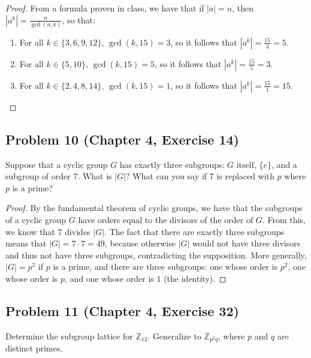 \documentclass{article}
\begin{document}
\begin{proof}

From a formula proven in class, we have that if $|a| = n$, then $|a^k| = \frac{n}{\gcd{(n, k)}}$, so that: 

\begin{enumerate}[label=(\alph*)]
\item For all $k \in \{3, 6, 9, 12\}$, $\gcd{(k, 15)} = 3$, so it follows that $|a^k| = \frac{15}{3} = 5$.
\item For all $k \in \{5, 10\}$, $\gcd{(k, 15)} = 5$, so it follows that $|a^k| = \frac{15}{5} = 3$.
\item For all $k \in \{2, 4, 8, 14\}$, $\gcd{(k, 15)} = 1$, so it follows that $|a^k| = \frac{15}{1} = 15$.

\end{enumerate}

\end{proof}

\subsection*{Problem 10 (Chapter 4, Exercise 14)}
Suppose that a cyclic group $G$ has exactly three subgroups: $G$ itself, $\{e\}$, and a subgroup of order 7. What is $|G|$? What can you say if 7 is replaced with $p$ where $p$ is a prime?

\begin{proof}

By the fundamental theorem of cyclic groups, we have that the subgroups of a cyclic group $G$ have orders equal to the divisors of the order of $G$. From this, we know that 7 divides $|G|$. The fact that there are exactly three subgroups means that $|G| = 7 \cdot 7 = 49$, because otherwise $|G|$ would not have three divisors and thus not have three subgroups, contradicting the supposition. More generally, $|G| = p^2$ if $p$ is a prime, and there are three subgroups: one whose order is $p^2$, one whose order is $p$, and one whose order is 1 (the identity).

\end{proof}

\subsection*{Problem 11 (Chapter 4, Exercise 32)}
Determine the subgroup lattice for $\mathbb{Z}_{12}$. Generalize to $\mathbb{Z}_{p^2q}$, where $p$ and $q$ are distinct primes.
\end{document}
